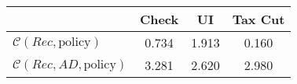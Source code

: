 \begin{tabular}{@{}lccc@{}}
\toprule
                          & Check      & UI    & Tax Cut    \\  \midrule
$\mathcal{C}(Rec,\text{policy})$ & 0.734  & 1.913  & 0.160     \\
$\mathcal{C}(Rec, AD,\text{policy})$ & 3.281  & 2.620  & 2.980     \\
\end{tabular}
